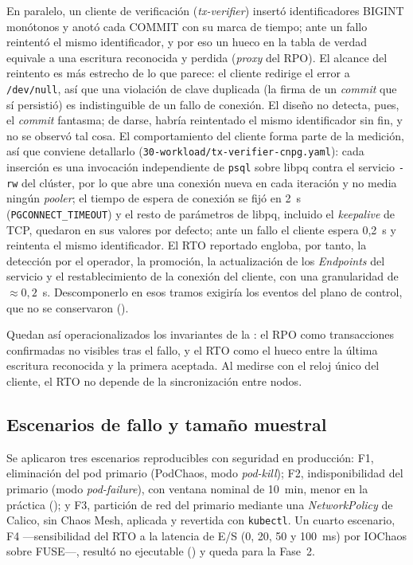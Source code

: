 En paralelo, un cliente de verificación (\textit{tx-verifier}) insertó identificadores BIGINT monótonos y anotó cada COMMIT con su marca de tiempo; ante un fallo reintentó el mismo identificador, y por eso un hueco en la tabla de verdad equivale a una escritura reconocida y perdida (\textit{proxy} del RPO). El alcance del reintento es más estrecho de lo que parece: el cliente redirige el error a \texttt{/dev/null}, así que una violación de clave duplicada (la firma de un \textit{commit} que sí persistió) es indistinguible de un fallo de conexión. El diseño no detecta, pues, el \textit{commit} fantasma; de darse, habría reintentado el mismo identificador sin fin, y no se observó tal cosa. El comportamiento del cliente forma parte de la medición, así que conviene detallarlo (\texttt{30-workload/\allowbreak tx-verifier-cnpg.yaml}): cada inserción es una invocación independiente de \texttt{psql} sobre libpq contra el servicio \texttt{-rw} del clúster, por lo que abre una conexión nueva en cada iteración y no media ningún \textit{pooler}; el tiempo de espera de conexión se fijó en 2~s (\texttt{PGCONNECT\_TIMEOUT}) y el resto de parámetros de libpq, incluido el \textit{keepalive} de TCP, quedaron en sus valores por defecto; ante un fallo el cliente espera 0,2~s y reintenta el mismo identificador. El RTO reportado engloba, por tanto, la detección por el operador, la promoción, la actualización de los \textit{Endpoints} del servicio y el restablecimiento de la conexión del cliente, con una granularidad de $\approx 0{,}2$~s. Descomponerlo en esos tramos exigiría los eventos del plano de control, que no se conservaron ().

Quedan así operacionalizados los invariantes de la : el RPO como transacciones confirmadas no visibles tras el fallo, y el RTO como el hueco entre la última escritura reconocida y la primera aceptada. Al medirse con el reloj único del cliente, el RTO no depende de la sincronización entre nodos.

\subsection{Escenarios de fallo y tamaño muestral}\label{sec:escenarios}
Se aplicaron tres escenarios reproducibles con seguridad en producción: F1, eliminación del pod primario (PodChaos, modo \textit{pod-kill}); F2, indisponibilidad del primario (modo \textit{pod-failure}), con ventana nominal de 10~min, menor en la práctica (); y F3, partición de red del primario mediante una \textit{NetworkPolicy} de Calico, sin Chaos Mesh, aplicada y revertida con \texttt{kubectl}. Un cuarto escenario, F4 —sensibilidad del RTO a la latencia de E/S (0, 20, 50 y 100~ms) por IOChaos sobre FUSE—, resultó no ejecutable () y queda para la Fase~2.

